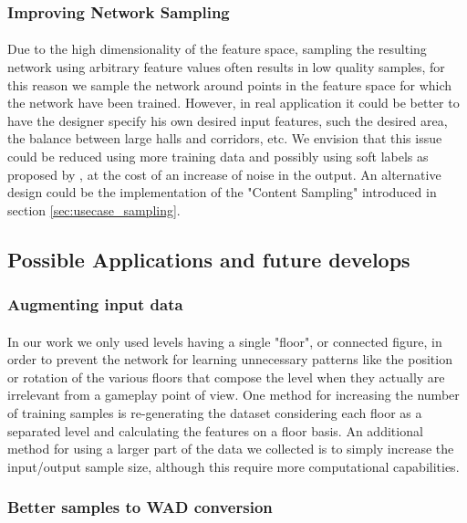 \subsubsection{Improving Network Sampling}
\label{sec:sampling}
\paragraph{} Due to the high dimensionality of the feature space, sampling the resulting network using arbitrary feature values often results in low quality samples, for this reason we sample the network around points in the feature space for which the network have been trained. However, in real application it could be better to have the designer specify his own desired input features, such the desired area, the balance between large halls and corridors, etc. We envision that this issue could be reduced using more training data and possibly using soft labels as proposed by \cite{improved_gan}, at the cost of an increase of noise in the output. An alternative design could be the implementation of the "Content Sampling" introduced in section \ref{sec:usecase_sampling}.

\subsection{Possible Applications and future develops}
\subsubsection{Augmenting input data}
\label{sec:data-augmentation}
\paragraph{} In our work we only used levels having a single "floor", or connected figure, in order to prevent the network for learning unnecessary patterns like the position or rotation of the various floors that compose the level when they actually are irrelevant from a gameplay point of view. One method for increasing the number of training samples is re-generating the dataset considering each floor as a separated level and calculating the features on a floor basis. An additional method for using a larger part of the data we collected is to simply increase the input/output sample size, although this require more computational capabilities. 

\subsubsection{Better samples to WAD conversion}
